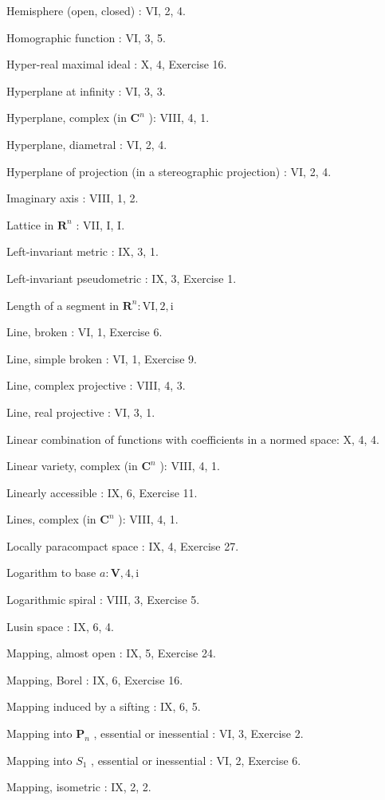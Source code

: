 Hemisphere (open, closed) : VI, 2, 4.

Homographic function : VI, 3, 5.

Hyper-real maximal ideal : X, 4, Exercise 16.

Hyperplane at infinity : VI, 3, 3.

Hyperplane, complex (in \(\mathbf{C}^n\) ): VIII, 4, 1.

Hyperplane, diametral : VI, 2, 4.

Hyperplane of projection (in a stereographic projection) : VI, 2, 4.

Imaginary axis : VIII, 1, 2.

Lattice in \(\mathbf{R}^n\) : VII, I, I.

Left-invariant metric : IX, 3, 1.

Left-invariant pseudometric : IX, 3, Exercise 1.

Length of a segment in \(\mathbf{R}^n:\mathrm{VI},2,\mathrm{i}\)

Line, broken : VI, 1, Exercise 6.

Line, simple broken : VI, 1, Exercise 9.

Line, complex projective : VIII, 4, 3.

Line, real projective : VI, 3, 1.

Linear combination of functions with coefficients in a normed space: X, 4, 4.

Linear variety, complex (in \(\mathbf{C}^n\) ): VIII, 4, 1.

Linearly accessible : IX, 6, Exercise 11.

Lines, complex (in \(\mathbf{C}^n\) ): VIII, 4, 1.

Locally paracompact space : IX, 4, Exercise 27.

Logarithm to base \(a:\mathbf{V},4,\mathrm{i}\)

Logarithmic spiral : VIII, 3, Exercise 5.

Lusin space : IX, 6, 4.

Mapping, almost open : IX, 5, Exercise 24.

Mapping, Borel : IX, 6, Exercise 16.

Mapping induced by a sifting : IX, 6, 5.

Mapping into \(\mathbf{P}_n\) , essential or inessential : VI, 3, Exercise 2.

Mapping into \(S_{1}\) , essential or inessential : VI, 2, Exercise 6.

Mapping, isometric : IX, 2, 2.

